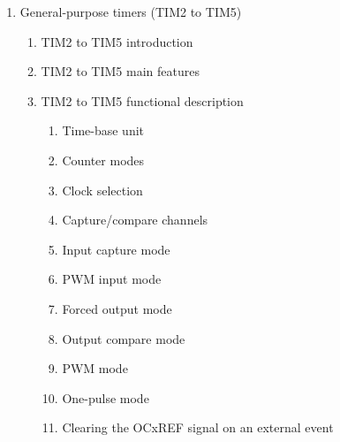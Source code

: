 \documentclass{article}
\begin{document}
\begin{enumerate}
\begin{enumerate}
\begin{enumerate}
            \item TIM1 repetition counter register (TIMx\_RCR) 
            \item TIM1 capture/compare register 1 (TIMx\_CCR1) 
            \item TIM1 capture/compare register 2 (TIMx\_CCR2) 
            \item TIM1 capture/compare register 3 (TIMx\_CCR3) 
            \item TIM1 capture/compare register 4 (TIMx\_CCR4) 
            \item TIM1 break and dead-time register (TIMx\_BDTR) 
            \item TIM1 DMA control register (TIMx\_DCR) 
            \item TIM1 DMA address for full transfer (TIMx\_DMAR) 
            \item TIM1 register map 
        \end{enumerate}
    \end{enumerate}
    \item General-purpose timers (TIM2 to TIM5) 
    \begin{enumerate}
        \item TIM2 to TIM5 introduction 
        \item TIM2 to TIM5 main features 
        \item TIM2 to TIM5 functional description 
        \begin{enumerate}
            \item Time-base unit 
            \item Counter modes 
            \item Clock selection 
            \item Capture/compare channels 
            \item Input capture mode 
            \item PWM input mode 
            \item Forced output mode 
            \item Output compare mode 
            \item PWM mode 
            \item One-pulse mode 
            \item Clearing the OCxREF signal on an external event 

\end{enumerate}
\end{enumerate}
\end{enumerate}
\end{document}
